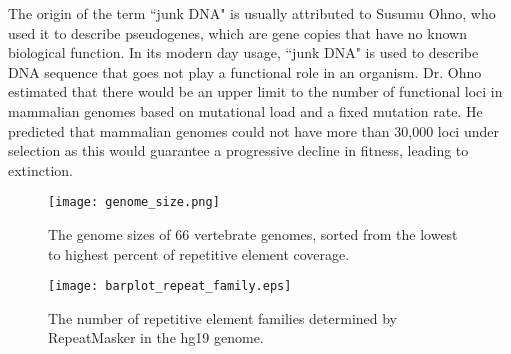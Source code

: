 The origin of the term ``junk DNA" is usually attributed to Susumu Ohno, who used it to describe pseudogenes, which are gene copies that have no known biological function. In its modern day usage, ``junk DNA" is used to describe DNA sequence that goes not play a functional role in an organism. Dr. Ohno estimated that there would be an upper limit to the number of functional loci in mammalian genomes based on mutational load and a fixed mutation rate. He predicted that mammalian genomes could not have more than 30,000 loci under selection as this would guarantee a progressive decline in fitness, leading to extinction.

\begin{figure}[h]
   \centering
   \texttt{[image: genome\_size.png]}
   \caption[Vertebrate genomes sizes]{The genome sizes of 66 vertebrate genomes, sorted from the lowest to highest percent of repetitive element coverage\cite{tang2014gensize}.}
   \label{fig:genome_size}
\end{figure}

\begin{figure}[h]
   \centering
   \texttt{[image: barplot\_repeat\_family.eps]}
   \caption[Tally of repetitive element families in the hg19 genome]{The number of repetitive element families determined by RepeatMasker in the hg19 genome.}
   \label{fig:repeat_family}
\end{figure}

